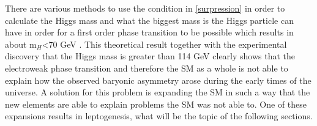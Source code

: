 There are various methods to use the condition in \ref{surpression} in order to calculate the Higgs mass and what the biggest mass is the Higgs particle can have in order for a first order phase transition to be possible which results in about m$_H$<70 GeV \cite[pp. 3f.]{Fodor:1999at}. \newline
This theoretical result together with the experimental discovery that the Higgs mass is greater than 114 GeV \cite[pp. 100ff.]{Abbaneo:2001ix} clearly shows that the electroweak phase transition and therefore the SM as a whole is not able to explain how the observed baryonic asymmetry arose during the early times of the universe. \newline
A solution for this problem is expanding the SM in such a way that the new elements are able to explain problems the SM was not able to. One of these expansions results in leptogenesis, what will be the topic of the following sections.